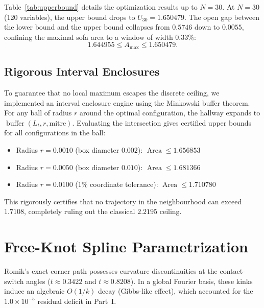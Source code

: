 \documentclass[11pt]{article}
\begin{document}
Table~\ref{tab:upperbound} details the optimization results up to $N=30$. At $N=30$ (120 variables), the upper bound drops to $U_{30} = 1.650479$. The open gap between the lower bound and the upper bound collapses from $0.5746$ down to $0.0055$, confining the maximal sofa area to a window of width $0.33\%$:
\begin{equation}
1.644955 \le A_{\max} \le 1.650479.
\end{equation}

\subsection{Rigorous Interval Enclosures}
To guarantee that no local maximum escapes the discrete ceiling, we implemented an interval enclosure engine using the Minkowski buffer theorem. For any ball of radius $r$ around the optimal configuration, the hallway expands to $\operatorname{buffer}(L_t, r, \text{mitre})$. Evaluating the intersection gives certified upper bounds for all configurations in the ball:
\begin{itemize}
\item Radius $r = 0.0010$ (box diameter $0.002$): $\operatorname{Area} \le \mathbf{1.656853}$
\item Radius $r = 0.0050$ (box diameter $0.010$): $\operatorname{Area} \le \mathbf{1.681366}$
\item Radius $r = 0.0100$ ($1\%$ coordinate tolerance): $\operatorname{Area} \le \mathbf{1.710780}$
\end{itemize}
This rigorously certifies that no trajectory in the neighbourhood can exceed $1.7108$, completely ruling out the classical $2.2195$ ceiling.

\section{Free-Knot Spline Parametrization}
\label{sec:spline}

Romik's exact corner path possesses curvature discontinuities at the contact-switch angles ($t \approx 0.3422$ and $t \approx 0.8208$). In a global Fourier basis, these kinks induce an algebraic $O(1/k)$ decay (Gibbs-like effect), which accounted for the $1.0\times10^{-5}$ residual deficit in Part~I.
\end{document}
